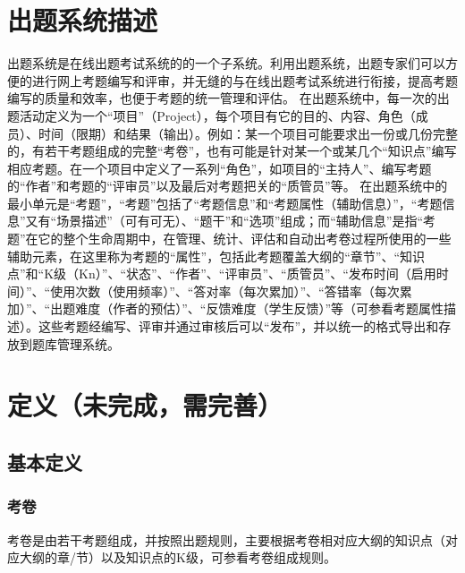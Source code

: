 \documentclass[hyperref, a4paper]{ctexart}
\begin{document}
\hypertarget{ux51faux9898ux7cfbux7edfux63cfux8ff0}{%
\section*{出题系统描述}\label{ux51faux9898ux7cfbux7edfux63cfux8ff0}}

出题系统是在线出题考试系统的的一个子系统。利用出题系统，出题专家们可以方便的进行网上考题编写和评审，并无缝的与在线出题考试系统进行衔接，提高考题编写的质量和效率，也便于考题的统一管理和评估。
在出题系统中，每一次的出题活动定义为一个``项目''（Project），每个项目有它的目的、内容、角色（成员）、时间（限期）和结果（输出）。例如：某一个项目可能要求出一份或几份完整的，有若干考题组成的完整``考卷''，也有可能是针对某一个或某几个``知识点''编写相应考题。在一个项目中定义了一系列``角色''，如项目的``主持人''、编写考题的``作者''和考题的``评审员''以及最后对考题把关的``质管员''等。
在出题系统中的最小单元是``考题''，``考题''包括了``考题信息''和``考题属性（辅助信息）''，``考题信息''又有``场景描述''（可有可无）、``题干''和``选项''组成；而``辅助信息''是指``考题''在它的整个生命周期中，在管理、统计、评估和自动出考卷过程所使用的一些辅助元素，在这里称为考题的``属性''，包括此考题覆盖大纲的``章节''、``知识点''和``K级（Kn）''、``状态''、``作者''、``评审员''、``质管员''、``发布时间（启用时间）''、``使用次数（使用频率）''、``答对率（每次累加）''、``答错率（每次累加）''、``出题难度（作者的预估）''、``反馈难度（学生反馈）''等（可参看考题属性描述）。这些考题经编写、评审并通过审核后可以``发布''，并以统一的格式导出和存放到题库管理系统。

\hypertarget{ux5b9aux4e49ux672aux5b8cux6210ux9700ux5b8cux5584}{%
\section{定义（未完成，需完善）}\label{ux5b9aux4e49ux672aux5b8cux6210ux9700ux5b8cux5584}}

\hypertarget{ux57faux672cux5b9aux4e49}{%
\subsection{基本定义}\label{ux57faux672cux5b9aux4e49}}

\hypertarget{ux8003ux5377}{%
\subsubsection{考卷}\label{ux8003ux5377}}

考卷是由若干考题组成，并按照出题规则，主要根据考卷相对应大纲的知识点（对应大纲的章/节）以及知识点的K级，可参看考卷组成规则。
\end{document}
